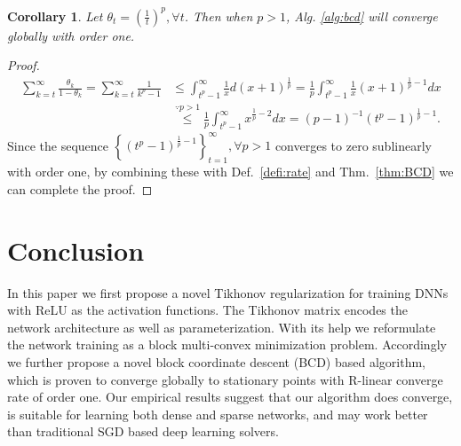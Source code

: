 \documentclass{article}
\newtheorem{cor}{Corollary}
\begin{document}
\begin{cor}
Let $\theta_t=\left(\frac{1}{t}\right)^p, \forall t$. Then when $p>1$, Alg. \ref{alg:bcd} will converge globally with order one.
\end{cor}
\begin{proof}
\begin{align}
\sum_{k=t}^{\infty}\frac{\theta_k}{1-\theta_k} = \sum_{k=t}^{\infty}\frac{1}{k^p-1} & \leq \int_{t^p-1}^{\infty}\frac{1}{x}d(x+1)^{\frac{1}{p}}=\frac{1}{p}\int_{t^p-1}^{\infty}\frac{1}{x}(x+1)^{\frac{1}{p}-1}dx \nonumber \\
& \stackrel{\because p>1}{\leq}\frac{1}{p}\int_{t^p-1}^{\infty}x^{\frac{1}{p}-2}dx = (p-1)^{-1}(t^p-1)^{\frac{1}{p}-1}.
\end{align}
Since the sequence $\left\{(t^p-1)^{\frac{1}{p}-1}\right\}_{t=1}^{\infty}, \forall p>1$ converges to zero sublinearly with order one, by combining these with Def.~\ref{defi:rate} and Thm.~\ref{thm:BCD} we can complete the proof.
\end{proof}

    
\section{Conclusion}
In this paper we first propose a novel Tikhonov regularization for training DNNs with ReLU as the activation functions. The Tikhonov matrix encodes the network architecture as well as parameterization. With its help we reformulate the network training as a block multi-convex minimization problem. Accordingly we further propose a novel block coordinate descent (BCD) based algorithm, which is proven to converge globally to stationary points with R-linear converge rate of order one. Our empirical results suggest that our algorithm does converge, is suitable for learning both dense and sparse networks, and may work better than traditional SGD based deep learning solvers. 
    
	
\newpage{\small


}  
	
\end{document}
